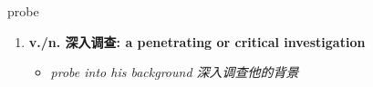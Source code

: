 
\begin{frame}
{\huge probe}
\begin{center}
\begin{enumerate}\Large
  \item \textbf{v./n. 深入调查: a penetrating or critical investigation}
  \begin{itemize}
    \item \em{\Large{probe into his background 深入调查他的背景}}
  \end{itemize}
\end{enumerate}
\end{center}
\end{frame}
